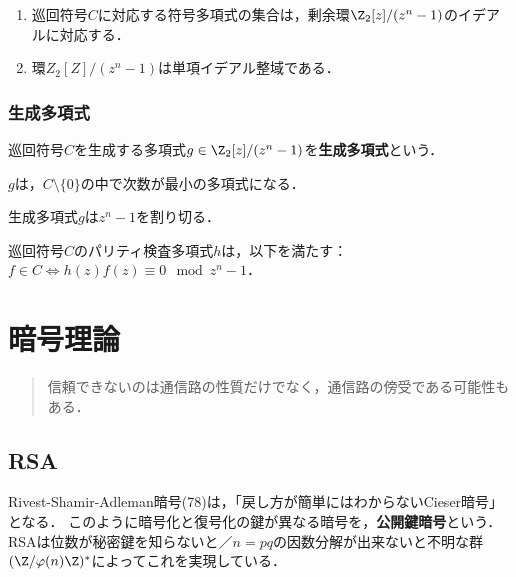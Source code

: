 \documentclass[uplatex,dvipdfmx]{jsreport}
\begin{document}
\begin{proposition}\mbox{}
    \begin{enumerate}
        \item 巡回符号$C$に対応する符号多項式の集合は，剰余環$\Z_2[z]/(z^n-1)$のイデアルに対応する．
        \item 環$Z_2[Z]/(z^n-1)$は単項イデアル整域である．
    \end{enumerate}
\end{proposition}

\subsection{生成多項式}

\begin{definition}
    巡回符号$C$を生成する多項式$g\in\Z_2[z]/(z^n-1)$を\textbf{生成多項式}という．
\end{definition}

\begin{lemma}
    $g$は，$C\setminus\{0\}$の中で次数が最小の多項式になる．
\end{lemma}

\begin{theorem}
    生成多項式$g$は$z^n-1$を割り切る．
\end{theorem}

\begin{theorem}
    巡回符号$C$のパリティ検査多項式$h$は，以下を満たす：$f\in C\Leftrightarrow h(z)f(z)\equiv 0\mod z^n-1$．
\end{theorem}

\chapter{暗号理論}

\begin{quotation}
    信頼できないのは通信路の性質だけでなく，通信路の傍受である可能性もある．
\end{quotation}

\section{RSA}

\begin{tcolorbox}[colframe=ForestGreen, colback=ForestGreen!10!white,breakable,colbacktitle=ForestGreen!40!white,coltitle=black,fonttitle=\bfseries\sffamily,
title=]
    Rivest-Shamir-Adleman暗号(78)は，「戻し方が簡単にはわからないCieser暗号」となる．
    このように暗号化と復号化の鍵が異なる暗号を，\textbf{公開鍵暗号}という．
    RSAは位数が秘密鍵を知らないと／$n=pq$の因数分解が出来ないと不明な群$(\Z/\varphi(n)\Z)^*$によってこれを実現している．
\end{tcolorbox}
\end{document}
